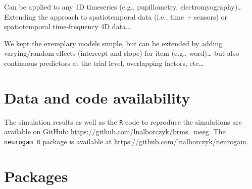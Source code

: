 \documentclass[
  doc,
  floatsintext,
  longtable,
  a4paper,
  nolmodern,
  notxfonts,
  notimes,
  donotrepeattitle,
  colorlinks=true,linkcolor=blue,citecolor=blue,urlcolor=blue]{apa7}
\begin{document}
Can be applied to any 1D timeseries (e.g., pupillometry,
electromyography)\ldots{} Extending the approach to spatiotemporal data
(i.e., time + sensors) or spatiotemporal time-frequency 4D data\ldots{}

We kept the exemplary models simple, but can be extended by adding
varying/random effects (intercept and slope) for item (e.g.,
word)\ldots{} but also continuous predictors at the trial level,
overlapping factors, etc\ldots{}

\newpage

\section{Data and code availability}\label{data-and-code-availability}

The simulation results as well as the \texttt{R} code to reproduce the
simulations are available on GitHub:
\url{https://github.com/lnalborczyk/brms_meeg}. The \texttt{neurogam\ R}
package is available at \url{https://github.com/lnalborczyk/neurogam}.

\section{Packages}\label{packages}
\end{document}
